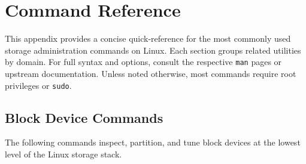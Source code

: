 \chapter{Command Reference}\label{app:commands}

This appendix provides a concise quick-reference for the most commonly used
storage administration commands on Linux. Each section groups related
utilities by domain. For full syntax and options, consult the respective
\texttt{man} pages or upstream documentation. Unless noted otherwise, most
commands require root privileges or \texttt{sudo}.

\section*{Block Device Commands}

The following commands inspect, partition, and tune block devices at the lowest
level of the Linux storage stack.

